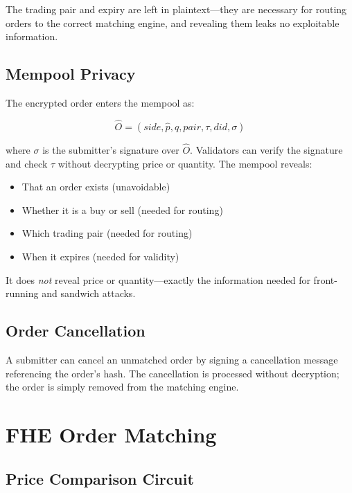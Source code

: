 \documentclass[11pt,letterpaper]{article}
\theoremstyle{definition}
\theoremstyle{remark}
\begin{document}
The trading pair and expiry are left in plaintext---they are necessary for routing orders to the correct matching engine, and revealing them leaks no exploitable information.

\subsection{Mempool Privacy}

The encrypted order enters the mempool as:

\begin{equation}
\hat{O} = (\textit{side}, \hat{p}, \hat{q}, \textit{pair}, \tau, \textit{did}, \sigma)
\end{equation}

where $\sigma$ is the submitter's signature over $\hat{O}$. Validators can verify the signature and check $\tau$ without decrypting price or quantity. The mempool reveals:

\begin{itemize}
    \item That an order exists (unavoidable)
    \item Whether it is a buy or sell (needed for routing)
    \item Which trading pair (needed for routing)
    \item When it expires (needed for validity)
\end{itemize}

It does \emph{not} reveal price or quantity---exactly the information needed for front-running and sandwich attacks.

\subsection{Order Cancellation}

A submitter can cancel an unmatched order by signing a cancellation message referencing the order's hash. The cancellation is processed without decryption; the order is simply removed from the matching engine.

\section{FHE Order Matching}
\label{sec:matching}

\subsection{Price Comparison Circuit}
\end{document}
